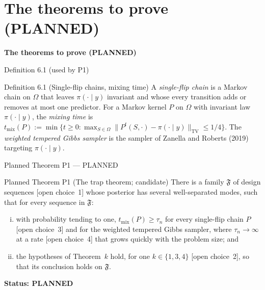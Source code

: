 \documentclass[aspectratio=169]{beamer}
\newcommand{\norm}[1]{\lVert #1\rVert}
\newcommand{\Om}{\Omega}
\newcommand{\pis}[1]{\pi(#1\mid y)}
\begin{document}
\section{The theorems to prove (PLANNED)}
\begin{frame}
\centering\Large\textbf{The theorems to prove (PLANNED)}
\end{frame}

\begin{frame}{Definition 6.1 (used by P1)}
\small
\begin{block}{Definition 6.1 (Single-flip chains, mixing time)}
A \emph{single-flip chain} is a Markov chain on $\Om$ that leaves $\pis{\cdot}$ invariant and whose every transition
adds or removes at most one predictor. For a Markov kernel $P$ on $\Om$ with invariant law $\pis{\cdot}$, the
\emph{mixing time} is $t_{\mathrm{mix}}(P):=\min\{t\ge0:\max_{S\in\Om}\norm{P^t(S,\cdot)-\pis{\cdot}}_{\mathrm{TV}}\le1/4\}$.
The \emph{weighted tempered Gibbs sampler} is the sampler of Zanella and Roberts (2019) targeting $\pis{\cdot}$.
\end{block}
\end{frame}

\begin{frame}{Planned Theorem P1 --- PLANNED}
\small
\begin{alertblock}{Planned Theorem P1 (The trap theorem; candidate)}
There is a family $\mathfrak F$ of design sequences \textup{[open choice~1]} whose posterior has several well-separated
modes, such that for every sequence in $\mathfrak F$:
\begin{enumerate}[(i)]
  \item with probability tending to one, $t_{\mathrm{mix}}(P)\ge\tau_n$ for every single-flip chain $P$
    \textup{[open choice~3]} and for the weighted tempered Gibbs sampler, where $\tau_n\to\infty$ at a rate
    \textup{[open choice~4]} that grows quickly with the problem size; and
  \item the hypotheses of Theorem~$k$ hold, for one $k\in\{1,3,4\}$ \textup{[open choice~2]}, so that its conclusion holds
    on $\mathfrak F$.
\end{enumerate}
\end{alertblock}
\medskip\noindent\textbf{Status: PLANNED}
\end{frame}
\end{document}
